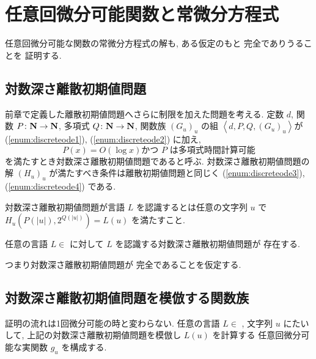 \section{任意回微分可能関数と常微分方程式}

 任意回微分可能な関数の常微分方程式の解も, ある仮定のもと \PSPACE 完全でありうることを
 証明する.

  \subsection{対数深さ離散初期値問題}
  前章で定義した離散初期値問題へさらに制限を加えた問題を考える.
  定数 $d$, 関数 $P \colon \mathbf N \to \mathbf N$, 多項式 $Q \colon \mathbf N \to \mathbf N$, 
  関数族 $(G_u)_u$ の組 $\left< d, P, Q, (G_u)_u \right>$が
  (\ref{enum:discreteode1}), (\ref{enum:discreteode2}) に加え,
  \begin{equation}
   P(x) = O(\log x) \text{かつ $P$ は多項式時間計算可能}
  \end{equation}
  を満たすとき対数深さ離散初期値問題であると呼ぶ.
  対数深さ離散初期値問題の解 $(H_u)_u$ が満たすべき条件は離散初期値問題と同じく
  (\ref{enum:discreteode3}), (\ref{enum:discreteode4}) である.

  対数深さ離散初期値問題が言語 $L$ を認識するとは任意の文字列 $u$ で
  $H_u(P(|u|), 2^{Q(|u|)}) = L(u)$ を満たすこと.

 \begin{hypothesis}
  \label{Hypothesis}
  任意の言語 $L \in$ \PSPACE に対して $L$ を認識する対数深さ離散初期値問題が
  存在する.
 \end{hypothesis}

 つまり対数深さ離散初期値問題が \PSPACE 完全であることを仮定する. 

 \subsection{対数深さ離散初期値問題を模倣する関数族}

 証明の流れは1回微分可能の時と変わらない.
 任意の言語 $L \in $ \PSPACE, 文字列 $u$ にたいして,
 上記の対数深さ離散初期値問題を模倣し $L(u)$ を計算する
 任意回微分可能な実関数 $g_u$ を構成する.

